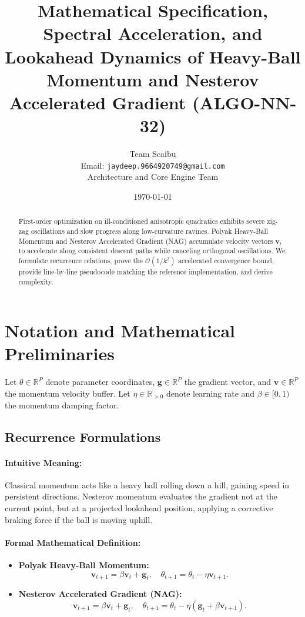 \documentclass[11pt]{article}
\title{\textbf{Mathematical Specification, Spectral Acceleration, and Lookahead Dynamics of Heavy-Ball Momentum and Nesterov Accelerated Gradient (ALGO-NN-32)}}
\author{Team Scaibu \\ \small Email: \texttt{jaydeep.9664920749@gmail.com} \\ \small Architecture and Core Engine Team}
\date{\today}
\begin{document}
\maketitle

\begin{abstract}
First-order optimization on ill-conditioned anisotropic quadratics exhibits severe zig-zag oscillations and slow progress along low-curvature ravines. Polyak Heavy-Ball Momentum and Nesterov Accelerated Gradient (NAG) accumulate velocity vectors $\mathbf{v}_t$ to accelerate along consistent descent paths while canceling orthogonal oscillations. We formulate recurrence relations, prove the $\mathcal{O}(1/k^2)$ accelerated convergence bound, provide line-by-line pseudocode matching the reference implementation, and derive complexity.
\end{abstract}

\section{Notation and Mathematical Preliminaries}
\label{sec:notation}

Let $\theta \in \mathbb{R}^P$ denote parameter coordinates, $\mathbf{g} \in \mathbb{R}^P$ the gradient vector, and $\mathbf{v} \in \mathbb{R}^P$ the momentum velocity buffer. Let $\eta \in \mathbb{R}_{>0}$ denote learning rate and $\beta \in [0, 1)$ the momentum damping factor.

\subsection{Recurrence Formulations}
\paragraph{Intuitive Meaning:} Classical momentum acts like a heavy ball rolling down a hill, gaining speed in persistent directions. Nesterov momentum evaluates the gradient not at the current point, but at a projected lookahead position, applying a corrective braking force if the ball is moving uphill.

\paragraph{Formal Mathematical Definition:}
\begin{itemize}
    \item \textbf{Polyak Heavy-Ball Momentum:}
    \begin{equation}
    \label{eq:polyak_momentum}
    \mathbf{v}_{t+1} = \beta \mathbf{v}_t + \mathbf{g}_t, \quad \theta_{t+1} = \theta_t - \eta \mathbf{v}_{t+1}.
    \end{equation}
    \item \textbf{Nesterov Accelerated Gradient (NAG):}
    \begin{equation}
    \label{eq:nesterov_momentum}
    \mathbf{v}_{t+1} = \beta \mathbf{v}_t + \mathbf{g}_t, \quad \theta_{t+1} = \theta_t - \eta (\mathbf{g}_t + \beta \mathbf{v}_{t+1}).
    \end{equation}
\end{itemize}
\end{document}
